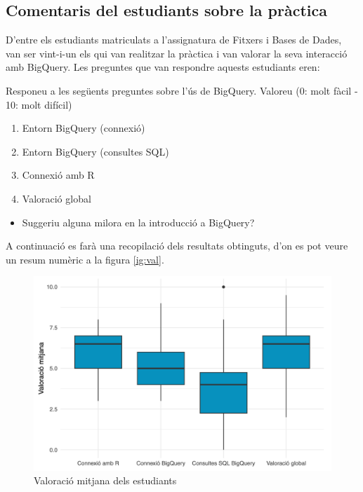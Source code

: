 \documentclass[12pt,longbibliography]{article}
\theoremstyle{definition}
\theoremstyle{remark}
\begin{document}
\begin{enumerate}
\end{enumerate}

\subsection{Comentaris del estudiants sobre la pràctica}

D'entre els estudiants matriculats a l'assignatura de Fitxers i Bases de Dades, van ser vint-i-un els qui van realitzar la pràctica i van valorar la seva interacció amb BigQuery. Les preguntes que van respondre aquests estudiants eren:


Responeu a les següents preguntes sobre l'ús de BigQuery. Valoreu (0: molt fàcil - 10: molt difícil)


\begin{enumerate}

\item Entorn BigQuery (connexió)

\item Entorn BigQuery (consultes SQL)

\item Connexió amb R

\item Valoració global

\end{enumerate}

\begin{itemize}

\item Suggeriu alguna milora en la introducció a BigQuery?

\end{itemize}

A continuació es farà una recopilació dels resultats obtinguts, d'on es pot veure un resum numèric a la figura \ref{ig:val}.

\begin{figure}[h!]
\begin{center}
\includegraphics[width=13.5cm]{val}
\end{center}
\caption{Valoració mitjana dels estudiants}
\label{fig:val}
\end{figure}
\end{document}
